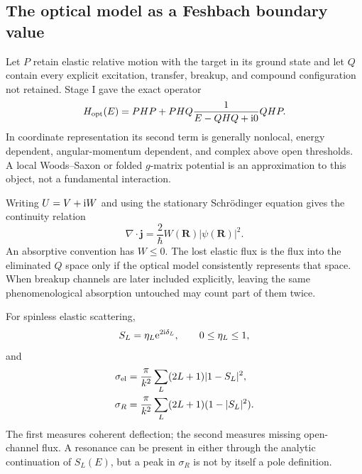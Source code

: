 \subsection{The optical model as a Feshbach boundary value}
\label{subsec:optical-model-feshbach}

Let $P$ retain elastic relative motion with the target in its ground state and
let $Q$ contain every explicit excitation, transfer, breakup, and compound
configuration not retained.  Stage I gave the exact operator
\begin{equation}
  H_{\mathrm{opt}}(E)
  =PHP+PHQ\frac{1}{E-QHQ+\mathrm{i}0}QHP.
  \label{eq:exact-optical-H}
\end{equation}
In coordinate representation its second term is generally nonlocal,
energy dependent, angular-momentum dependent, and complex above open
thresholds.  A local Woods--Saxon or folded $g$-matrix potential is an
approximation to this object, not a fundamental interaction.

Writing $U=V+\mathrm{i} W$ and using the stationary Schr\"odinger equation gives the
continuity relation
\begin{equation}
  \nabla\cdot\bm j
  =\frac{2}{\hbar}W(\bm R)|\psi(\bm R)|^2.
  \label{eq:optical-continuity}
\end{equation}
An absorptive convention has $W\leq0$.  The lost elastic flux is the flux into
the eliminated $Q$ space only if the optical model consistently represents
that space.  When breakup channels are later included explicitly, leaving the
same phenomenological absorption untouched may count part of them twice.

For spinless elastic scattering,
\begin{equation}
  S_L=\eta_L\mathrm{e}^{2\mathrm{i}\delta_L},
  \qquad 0\leq\eta_L\leq1,
  \label{eq:optical-SL}
\end{equation}
and
\begin{align}
  \sigma_{\mathrm{el}}
  &=\frac{\pi}{k^2}\sum_L(2L+1)|1-S_L|^2,
  \label{eq:optical-elastic-xs}\\
  \sigma_R
  &=\frac{\pi}{k^2}\sum_L(2L+1)(1-|S_L|^2).
  \label{eq:optical-reaction-xs}
\end{align}
The first measures coherent deflection; the second measures missing open-
channel flux.  A resonance can be present in either through the analytic
continuation of $S_L(E)$, but a peak in $\sigma_R$ is not by itself a pole
definition.

